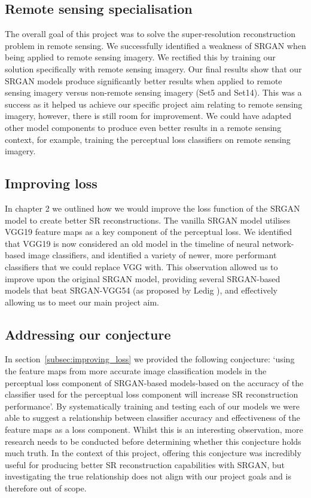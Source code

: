 \subsection{Remote sensing specialisation}
The overall goal of this project was to solve the super-resolution reconstruction problem in remote sensing. We successfully identified a weakness of SRGAN when being applied to remote sensing imagery. We rectified this by training our solution specifically with remote sensing imagery. Our final results show that our SRGAN models produce significantly better results when applied to remote sensing imagery versus non-remote sensing imagery (Set5 and Set14). This was a success as it helped us achieve our specific project aim relating to remote sensing imagery, however, there is still room for improvement. We could have adapted other model components to produce even better results in a remote sensing context, for example, training the perceptual loss classifiers on remote sensing imagery.

\subsection{Improving loss}
In chapter 2 we outlined how we would improve the loss function of the SRGAN model to create better SR reconstructions. The vanilla SRGAN model utilises VGG19 feature maps as a key component of the perceptual loss. We identified that VGG19 is now considered an old model in the timeline of neural network-based image classifiers, and identified a variety of newer, more performant classifiers that we could replace VGG with. This observation allowed us to improve upon the original SRGAN model, providing several SRGAN-based models that beat SRGAN-VGG54 (as proposed by Ledig \etal), and effectively allowing us to meet our main project aim.

\subsection{Addressing our conjecture}
In section~\ref{subsec:improving_loss} we provided the following conjecture: `using the feature maps from more accurate image classification models in the perceptual loss component of SRGAN-based models-based on the accuracy of the classifier used for the perceptual loss component will increase SR reconstruction performance'. By systematically training and testing each of our models we were able to suggest a relationship between classifier accuracy and effectiveness of the feature maps as a loss component. Whilst this is an interesting observation, more research needs to be conducted before determining whether this conjecture holds much truth. In the context of this project, offering this conjecture was incredibly useful for producing better SR reconstruction capabilities with SRGAN, but investigating the true relationship does not align with our project goals and is therefore out of scope.

